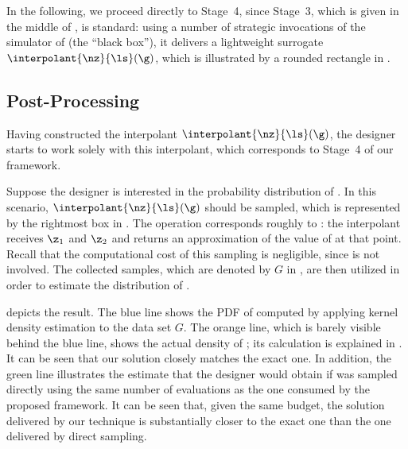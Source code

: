 In the following, we proceed directly to Stage~4, since Stage~3, which is given
in the middle of , is standard: using a number of
strategic invocations of the simulator of \g (the ``black box''), it delivers a
lightweight surrogate $\interpolant{\nz}{\ls}(\g)$, which is illustrated by a
rounded rectangle in .

\subsection{Post-Processing}

Having constructed the interpolant $\interpolant{\nz}{\ls}(\g)$, the designer
starts to work solely with this interpolant, which corresponds to Stage~4 of our
framework.

Suppose the designer is interested in the probability distribution of \g. In
this scenario, $\interpolant{\nz}{\ls}(\g)$ should be sampled, which is
represented by the rightmost box in . The operation
corresponds roughly to : the interpolant receives $\z_1$
and $\z_2$ and returns an approximation of the value of \g at that point. Recall
that the computational cost of this sampling is negligible, since \g is not
involved. The collected samples, which are denoted by $G$ in
, are then utilized in order to estimate the
distribution of \g.

 depicts the result. The blue line shows the \ac{PDF} of \g
computed by applying kernel density estimation \cite{hastie2013} to the data set
$G$. The orange line, which is barely visible behind the blue line, shows the
actual density of \g; its calculation is explained in . It
can be seen that our solution closely matches the exact one. In addition, the
green line illustrates the estimate that the designer would obtain if \g was
sampled directly using the same number of evaluations as the one consumed by the
proposed framework. It can be seen that, given the same budget, the solution
delivered by our technique is substantially closer to the exact one than the one
delivered by direct sampling.
